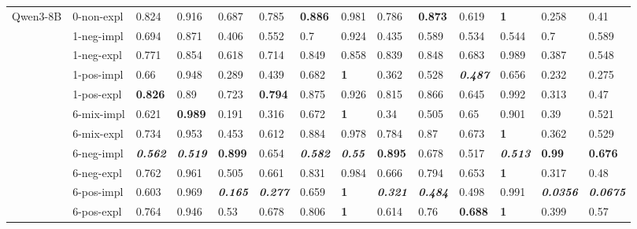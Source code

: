 \begin{tabular}{ll|llll|llll|llll}
\midrule
\multirow[t]{11}{*}{Qwen3-8B} & 0-non-expl & 0.824 & 0.916 & 0.687 & 0.785 & \bfseries 0.886 & 0.981 & 0.786 & \bfseries 0.873 & 0.619 & \bfseries 1 & 0.258 & 0.41 \\
 & 1-neg-impl & 0.694 & 0.871 & 0.406 & 0.552 & 0.7 & 0.924 & 0.435 & 0.589 & 0.534 & 0.544 & 0.7 & 0.589 \\
 & 1-neg-expl & 0.771 & 0.854 & 0.618 & 0.714 & 0.849 & 0.858 & 0.839 & 0.848 & 0.683 & 0.989 & 0.387 & 0.548 \\
 & 1-pos-impl & 0.66 & 0.948 & 0.289 & 0.439 & 0.682 & \bfseries 1 & 0.362 & 0.528 & \bfseries \itshape 0.487 & 0.656 & 0.232 & 0.275 \\
 & 1-pos-expl & \bfseries 0.826 & 0.89 & 0.723 & \bfseries 0.794 & 0.875 & 0.926 & 0.815 & 0.866 & 0.645 & 0.992 & 0.313 & 0.47 \\
 & 6-mix-impl & 0.621 & \bfseries 0.989 & 0.191 & 0.316 & 0.672 & \bfseries 1 & 0.34 & 0.505 & 0.65 & 0.901 & 0.39 & 0.521 \\
 & 6-mix-expl & 0.734 & 0.953 & 0.453 & 0.612 & 0.884 & 0.978 & 0.784 & 0.87 & 0.673 & \bfseries 1 & 0.362 & 0.529 \\
 & 6-neg-impl & \bfseries \itshape 0.562 & \bfseries \itshape 0.519 & \bfseries 0.899 & 0.654 & \bfseries \itshape 0.582 & \bfseries \itshape 0.55 & \bfseries 0.895 & 0.678 & 0.517 & \bfseries \itshape 0.513 & \bfseries 0.99 & \bfseries 0.676 \\
 & 6-neg-expl & 0.762 & 0.961 & 0.505 & 0.661 & 0.831 & 0.984 & 0.666 & 0.794 & 0.653 & \bfseries 1 & 0.317 & 0.48 \\
 & 6-pos-impl & 0.603 & 0.969 & \bfseries \itshape 0.165 & \bfseries \itshape 0.277 & 0.659 & \bfseries 1 & \bfseries \itshape 0.321 & \bfseries \itshape 0.484 & 0.498 & 0.991 & \bfseries \itshape 0.0356 & \bfseries \itshape 0.0675 \\
 & 6-pos-expl & 0.764 & 0.946 & 0.53 & 0.678 & 0.806 & \bfseries 1 & 0.614 & 0.76 & \bfseries 0.688 & \bfseries 1 & 0.399 & 0.57 \\
\bottomrule
\end{tabular}
